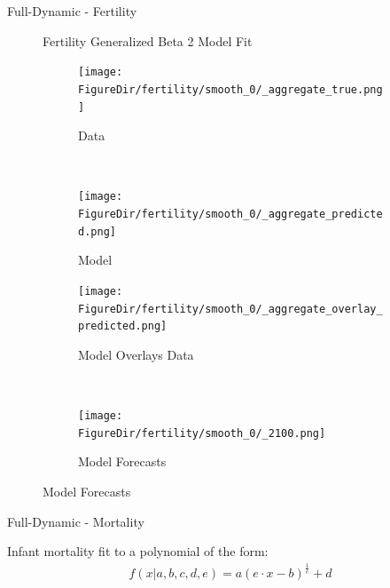 \documentclass[12pt]{beamer}
\newcommand*{\FigureDir}{../graphs}
\begin{document}
\begin{frame}{Full-Dynamic - Fertility}

	\begin{figure}[H]
	Fertility Generalized Beta 2 Model Fit
		\begin{subfigure}{0.5\textwidth}
			\centering
			\texttt{[image: \\FigureDir/fertility/smooth\_0/\_aggregate\_true.png]}
			\vspace{-5mm}
			\caption{Data}
		\end{subfigure}%
		~ %
		\begin{subfigure}{0.5\textwidth}
			\centering
			\texttt{[image: \\FigureDir/fertility/smooth\_0/\_aggregate\_predicted.png]}
			\vspace{-5mm}
			\caption{Model}
		\end{subfigure}%
		\newline
		\begin{subfigure}{0.5\textwidth}
			\centering
			\texttt{[image: \\FigureDir/fertility/smooth\_0/\_aggregate\_overlay\_predicted.png]}
			\vspace{-5mm}
			\caption{Model Overlays Data}
		\end{subfigure}%
		~ %
		\begin{subfigure}{0.5\textwidth}
			\centering
			\texttt{[image: \\FigureDir/fertility/smooth\_0/\_2100.png]}
			\vspace{-5mm}
			\caption{Model Forecasts}
		\end{subfigure}%
	\end{figure}

\end{frame}

\begin{frame}{Full-Dynamic - Mortality}

	Infant mortality fit to a polynomial of the form:
	\begin{align*}
		f(x|a, b, c, d, e) = a (e \cdot x - b)^{\frac{1}{c}} + d
	\end{align*}

	\begin{figure}[H]
		\centering
	 \end{figure}

\end{frame}
\end{document}
